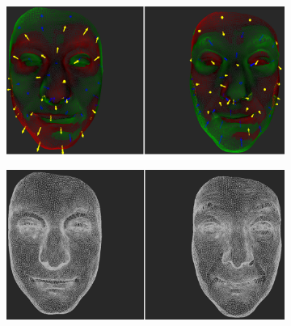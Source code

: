 \begin{figure}[h]
\centering
\begin{subfigure}{0.49\textwidth}
\includegraphics[width=\textwidth]{./screenshots/pair21.PNG}
\caption{}
\label{fig:study-9-21}
\end{subfigure}
\begin{subfigure}{0.49\textwidth}
\includegraphics[width=\textwidth]{./screenshots/pair19.PNG}
\caption{}
\label{fig:study-9-19}
\end{subfigure}


\end{figure}

